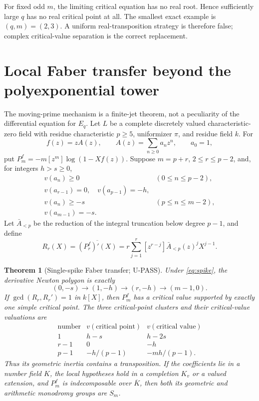 \documentclass[11pt]{article}
\theoremstyle{keio}
\newtheorem{theorem}{Theorem}[section]
\theoremstyle{keioinput}
\newcommand{\UPASS}{\textcolor{passgreen}{\textsf{U-PASS}}}
\begin{document}
For fixed odd $m$, the limiting critical equation has no real root. Hence
sufficiently large $q$ has no real critical point at all. The smallest exact
example is $(q,m)=(2,3)$. A uniform real-transposition strategy is therefore
false; complex critical-value separation is the correct replacement.

\section{Local Faber transfer beyond the polyexponential tower}

The moving-prime mechanism is a finite-jet theorem, not a peculiarity of
the differential equation for $E_q$. Let $L$ be a complete discretely
valued characteristic-zero field with residue characteristic $p\ge5$,
uniformizer $\pi$, and residue field $k$. For
\[
f(z)=zA(z),\qquad A(z)=\sum_{n\ge0}a_nz^n,\qquad a_0=1,
\]
put $P_m^f=-m[z^m]\log(1-Xf(z))$. Suppose $m=p+r$,
$2\le r\le p-2$, and, for integers $h>s\ge0$,
\begin{equation}
\begin{array}{ll}
v(a_n)\ge0 &(0\le n\le p-2),\\
v(a_{r-1})=0,\quad v(a_{p-1})=-h,\\
v(a_n)\ge-s &(p\le n\le m-2),\\
v(a_{m-1})=-s.
\end{array}
\label{eq:spike}
\end{equation}
Let $\bar A_{<p}$ be the reduction of the integral truncation below
degree $p-1$, and define
\begin{equation}
R_r(X)=\overline{(P_r^f)'(X)}
=r\sum_{j=1}^r[z^{r-j}]\bar A_{<p}(z)^jX^{j-1}.
\label{eq:R-general}
\end{equation}

\begin{theorem}[Single-spike Faber transfer; \UPASS]\label{thm:transfer}
Under \eqref{eq:spike}, the derivative Newton polygon is exactly
\begin{equation}
(0,-s)\longrightarrow(1,-h)\longrightarrow(r,-h)
\longrightarrow(m-1,0).
\label{eq:spike-NP}
\end{equation}
If $\gcd(R_r,R_r')=1$ in $k[X]$, then $P_m^f$ has a critical value
supported by exactly one simple critical point. The three critical-point
clusters and their critical-value valuations are
\begin{equation}
\begin{array}{c|c|c}
\text{number}&v(\text{critical point})&v(\text{critical value})\\ \hline
1&h-s&h-2s\\
r-1&0&-h\\
p-1&-h/(p-1)&-mh/(p-1).
\end{array}
\label{eq:cluster-table}
\end{equation}
Thus its geometric inertia contains a transposition. If the coefficients
lie in a number field $K$, the local hypotheses hold in a completion $K_v$
or a valued extension, and $P_m^f$ is indecomposable over $\overline K$,
then both its geometric and arithmetic monodromy groups are $S_m$.
\end{theorem}
\end{document}
